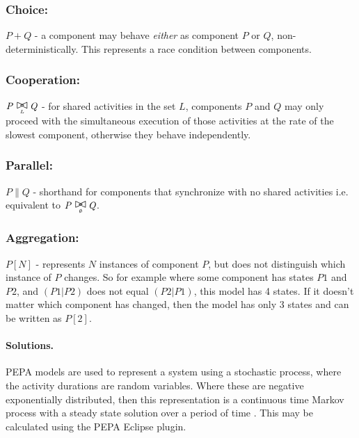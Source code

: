 \documentclass[runningheads]{llncs}
\begin{document}
\subsubsection{Choice:} $\mathit{P} + \mathit{Q}$ - a component may behave {\itshape either} as component $\mathit{P}$ or $\mathit{Q}$, non-deterministically.  This represents a race condition between components.
\subsubsection{Cooperation:} $\mathit{P} \sync{L} \mathit{Q}$ - for shared activities in the set $\mathit{L}$, components $\mathit{P}$ and $\mathit{Q}$ may only proceed with the simultaneous execution of those activities at the rate of the slowest component, otherwise they behave independently.
\subsubsection{Parallel:} $\mathit{P} \parallel \mathit{Q}$ - shorthand for components that synchronize with no shared activities i.e. equivalent to $\mathit{P} \sync{\emptyset} \mathit{Q}$.
\subsubsection{Aggregation:} $\mathit{P}[N]$ - represents $\mathit{N}$ instances of component $\mathit{P}$, but does not distinguish which instance of $\mathit{P}$ changes.  So for example where some component has states $\mathit{P1}$ and $\mathit{P2}$, and $\mathit{(P1|P2)}$ does not equal $\mathit{(P2|P1)}$, this model has 4 states.  If it doesn't matter which component has changed, then the model has only 3 states and can be written as $\mathit{P}[2]$.

\paragraph{Solutions.} PEPA models are used to represent a system using a stochastic process, where the activity durations are random variables.  Where these are negative exponentially distributed, then this representation is a continuous time Markov process with a steady state solution over a period of time \cite{RN1051}.  This may be calculated using the PEPA Eclipse plugin.

%
%



%
%



%
%



%
%



%
%



\end{document}
